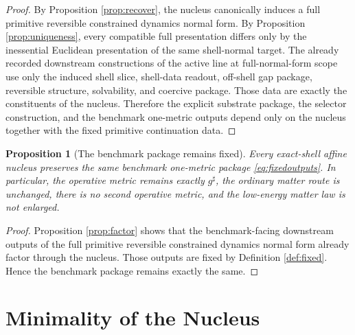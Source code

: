 \documentclass[11pt]{article}
\newcommand{\CompletedMetric}{g^{\sharp}}
\newtheorem{proposition}{Proposition}
\begin{document}
\begin{proof}
By Proposition \ref{prop:recover}, the nucleus canonically induces a full primitive reversible constrained dynamics normal form. By Proposition \ref{prop:uniqueness}, every compatible full presentation differs only by the inessential Euclidean presentation of the same shell-normal target. The already recorded downstream constructions of the active line at full-normal-form scope use only the induced shell slice, shell-data readout, off-shell gap package, reversible structure, solvability, and coercive package. Those data are exactly the constituents of the nucleus. Therefore the explicit substrate package, the selector construction, and the benchmark one-metric outputs depend only on the nucleus together with the fixed primitive continuation data.
\end{proof}

\begin{proposition}[The benchmark package remains fixed]
\label{prop:benchmark}
Every exact-shell affine nucleus preserves the same benchmark one-metric package \eqref{eq:fixedoutputs}. In particular, the operative metric remains exactly \(\CompletedMetric\), the ordinary matter route is unchanged, there is no second operative metric, and the low-energy matter law is not enlarged.
\end{proposition}

\begin{proof}
Proposition \ref{prop:factor} shows that the benchmark-facing downstream outputs of the full primitive reversible constrained dynamics normal form already factor through the nucleus. Those outputs are fixed by Definition \ref{def:fixed}. Hence the benchmark package remains exactly the same.
\end{proof}

\section{Minimality of the Nucleus}
\end{document}
